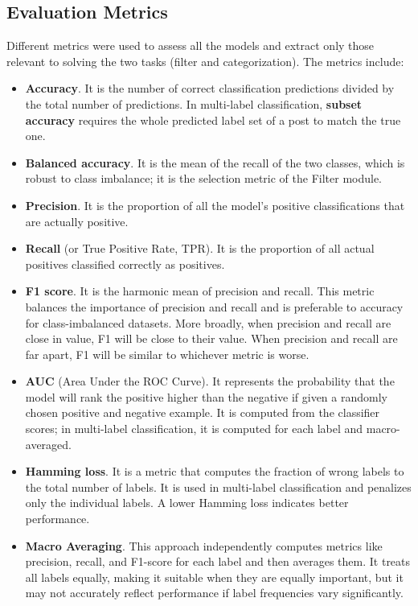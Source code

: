 \subsection{Evaluation Metrics}\label{subsec:evaluation-metrics}
Different metrics were used to assess all the models and extract only those relevant to solving the two tasks (filter and categorization). The metrics include:
\begin{itemize}
    \item \textbf{Accuracy}. It is the number of correct classification predictions divided by the total number of predictions. In multi-label classification, \textbf{subset accuracy} requires the whole predicted label set of a post to match the true one.
    \item \textbf{Balanced accuracy}. It is the mean of the recall of the two classes, which is robust to class imbalance; it is the selection metric of the Filter module.
    \item \textbf{Precision}. It is the proportion of all the model's positive classifications that are actually positive.
    \item \textbf{Recall} (or True Positive Rate, TPR). It is the proportion of all actual positives classified correctly as positives.
    \item \textbf{F1 score}. It is the harmonic mean of precision and recall. This metric balances the importance of precision and recall and is preferable to accuracy for class-imbalanced datasets. More broadly, when precision and recall are close in value, F1 will be close to their value. When precision and recall are far apart, F1 will be similar to whichever metric is worse.
    \item \textbf{AUC} (Area Under the ROC Curve). It represents the probability that the model will rank the positive higher than the negative if given a randomly chosen positive and negative example. It is computed from the classifier scores; in multi-label classification, it is computed for each label and macro-averaged.
    \item \textbf{Hamming loss}. It is a metric that computes the fraction of wrong labels to the total number of labels. It is used in multi-label classification and penalizes only the individual labels. A lower Hamming loss indicates better performance.
    \item \textbf{Macro Averaging}. This approach independently computes metrics like precision, recall, and F1-score for each label and then averages them. It treats all labels equally, making it suitable when they are equally important, but it may not accurately reflect performance if label frequencies vary significantly.

\end{itemize}

